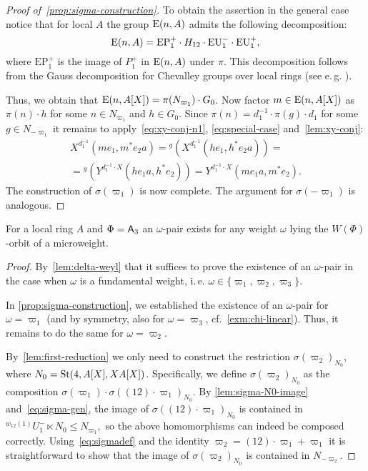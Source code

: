 \begin{proof}[Proof of~\cref{prop:sigma-construction}]
    To obtain the assertion in the general case notice that for local $A$ the group $\operatorname{E}(n, A)$ admits the following decomposition:
    \[\operatorname{E}(n, A) = \mathrm{EP}_1^+ \cdot H_{12} \cdot \mathrm{EU}^-_1 \cdot \mathrm{EU}^+_1, \]
    where $\mathrm{EP}_1^+$ is the image of $P_1^+$ in $\operatorname{E}(n, A)$ under $\pi$.
    This decomposition follows from the Gauss decomposition for Chevalley groups over local rings (see e.\,g. \cite[Theorem~1.1]{Sm12}).

    Thus, we obtain that $\operatorname{E}(n, A[X]) = \pi(N_{\varpi_1}) \cdot G_0$.
    Now factor $m \in \operatorname{E}(n, A[X])$ as $\pi(n) \cdot h$ for some $n\in N_{\varpi_1}$ and $h \in G_0$.
    Since $\pi(n) = d_1^{-1} \cdot \pi(g) \cdot d_1$ for some $g \in N_{-\varpi_1}$ it remains to apply~\eqref{eq:xy-conj-n1}, \eqref{eq:special-case} and~\cref{lem:xy-conj}:
    \begin{multline}
        \nonumber X^{d_1^{-1}}(me_1, m^*e_{2}a) = {}^{g}(X^{d_1^{-1}}(he_1, h^*e_{2}a)) = \\
        = {}^{g}(Y^{d_1^{-1} \cdot X}(he_{1}a, h^*e_2)) = Y^{d_1^{-1} \cdot X}(me_{1}a, m^{*} e_{2}).
    \end{multline}
    The construction of $\sigma(\varpi_1)$ is now complete.
    The argument for $\sigma(-\varpi_1)$ is analogous.
\end{proof}

\begin{cor} \label{cor:a3-microweight}
    For a local ring $A$ and $\Phi = \mathsf{A}_3$ an $\omega$-pair exists for any weight $\omega$ lying the $W(\Phi)$-orbit of a microweight.
\end{cor}
\begin{proof}
    By~\cref{lem:delta-weyl} that it suffices to prove the existence of an $\omega$-pair in the case when $\omega$ is a fundamental weight, i.\,e. $\omega \in \{\varpi_1, \varpi_2, \varpi_3\}$.

    In \cref{prop:sigma-construction}, we established the existence of an $\omega$-pair for $\omega = \varpi_1$
    (and by symmetry, also for $\omega = \varpi_3$, cf.~\cref{exm:chi-linear}).
    Thus, it remains to do the same for $\omega = \varpi_{2}$.

    By~\cref{lem:first-reduction} we only need to construct the restriction $\sigma(\varpi_2)_{N_0}$, where $N_0 = \operatorname{St}(4, A[X], XA[X])$.
    Specifically, we define $\sigma(\varpi_2)_{N_0}$ as the composition
    $\sigma(\varpi_1) \cdot \sigma((12) \cdot \varpi_1)_{N_0}$.
    By \cref{lem:sigma-N0-image} and~\eqref{eq:sigma-gen}, the image of $\sigma((12) \cdot \varpi_1)_{N_0}$ is contained in
    ${}^{w_{12}(1)}U_1^- \ltimes N_0 \leq N_{\varpi_1},$ so the above homomorphisms can indeed be composed correctly.
    Using~\eqref{eq:sigmadef} and the identity
    $\varpi_2 = (12) \cdot \varpi_1 + \varpi_1$ it is straightforward to show that the image of $\sigma(\varpi_2)_{N_0}$ is contained in $N_{-\varpi_2}$.
\end{proof}

